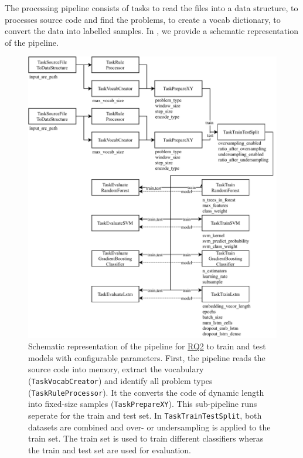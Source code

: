 The processing pipeline consists of tasks to read the files into a data structure, to processes source code and find the problems, to create a vocab dictionary, to convert the data into labelled samples. In , we provide a schematic representation of the pipeline.

\begin{figure}
    \includegraphics[width=1\textwidth]{img/ML/Pipeline_RQ2.pdf}
    \caption[Schematic representation of the pipeline to train and test models.]{Schematic representation of the pipeline for \hyperref[rq:2]{RQ2} to train and test models with configurable parameters. First, the pipeline reads the source code into memory, extract the vocabulary (\texttt{TaskVocabCreator}) and identify all problem types (\texttt{TaskRuleProcessor}). It the converts the code of dynamic length into fixed-size samples (\texttt{TaskPrepareXY}). This sub-pipeline runs seperate for the train and test set. In \texttt{TaskTrainTestSplit}, both datasets are combined and over- or undersampling is applied to the train set. The train set is used to train different classifiers wheras the train and test set are used for evaluation.}
    \label{fig:pipeline_rq2}
\end{figure}



